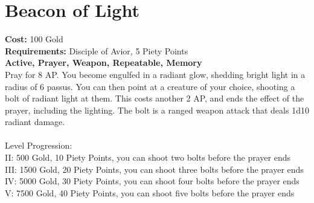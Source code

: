 \section*{Beacon of Light}
\textbf{Cost:} 100 Gold\\
\textbf{Requirements:} Disciple of Avior, 5 Piety Points \\
\textbf{Active, Prayer, Weapon, Repeatable, Memory}\\
Pray for 8 AP. You become engulfed in a radiant glow, shedding bright light in a radius of 6 passus. You can then point at a creature of your choice, shooting a bolt of radiant light at them. This costs another 2 AP, and ends the effect of the prayer, including the lighting. The bolt is a ranged weapon attack that deals 1d10 radiant damage.\\
\\
Level Progression:\\
II: 500 Gold, 10 Piety Points, you can shoot two bolts before the prayer ends\\
III: 1500 Gold, 20 Piety Points, you can shoot three bolts before the prayer ends\\
IV: 5000 Gold, 30 Piety Points, you can shoot four bolts before the prayer ends\\
V: 7500 Gold, 40 Piety Points, you can shoot five bolts before the prayer ends\\